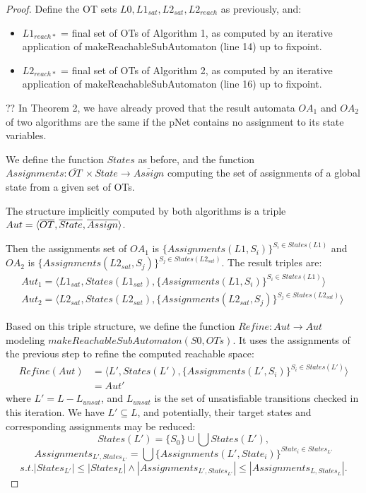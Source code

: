 \documentclass[smallcondensed]{svjour3}
\newcommand{\TODO}[1]{\textcolor{red}{\textbf{[TODO:#1]}}}
\begin{document}
\begin{proof}
  Define the OT sets $L0, L1_{sat}, L2_{sat}, L2_{reach}$ as previously, and:

  \begin{itemize}
    \item $L1_{reach*}$ = final set of OTs of Algorithm 1, as computed
        by an iterative application of makeReachableSubAutomaton (line
        14) up to fixpoint.
      \item $L2_{reach*}$ = final set of OTs of Algorithm 2, as computed
        by an iterative application of makeReachableSubAutomaton (line
        16) up to fixpoint.
  \end{itemize}

?? In Theorem 2, we have already proved that the result automata $OA_1$ and $OA_2$ of two algorithms are the same if the pNet contains no assignment to its state variables.

We define the function $States$ as before, and the function $Assignments : \overline{OT}\ \times State\rightarrow \overline{Assign}$
computing the set of assignments of a global state from a given set of OTs.

The structure implicitly computed by both algorithms is a triple $ Aut= \langle \overline{OT}, \overline{State},\\ \overline{Assign}\rangle$.

Then the assignments set of $OA_1$ is $\{Assignments(L1, S_i)\}^{S_i\in States(L1)}$ and $OA_2$ is $\{Assignments(L2_{sat}, S_j)\}^{S_j\in States(L2_{sat})}$. The result triples are:  
\noindent
\begin{align*}
Aut_1 = \langle L1_{sat}, States(L1_{sat}), \{Assignments(L1, S_i)\}^{S_i\in States(L1)}\rangle\\
Aut_2 = \langle L2_{sat}, States(L2_{sat}), \{Assignments(L2_{sat}, S_j)\}^{S_j\in States(L2_{sat})}\rangle \ 
\end{align*}

Based on this triple structure, we define the function $Refine : Aut \rightarrow Aut$ modeling $makeReachableSubAutomaton(S0,OTs)$. It uses the assignments of the previous step to refine the computed reachable space:
\begin{align*}
Refine(Aut) &=\langle L', States(L'), \{Assignments(L', S_i)\}^{S_i\in States(L')}\rangle \\
&=Aut'
\end{align*}
where $L' = L - L_{unsat}$, and $L_{unsat}$ is the set of unsatisfiable transitions checked in this iteration. We have $L'\subseteq L$, and potentially, their target states and corresponding assignments may be reduced: 
\[States(L')=\{S_0\}\cup \bigcup States(L'),\]
\[Assignments_{L',States_{L'}}=\bigcup\{Assignments(L', State_{i})\}^{State_{i}\in States_{L'}} \]
\[s.t. |States_{L'}|\le|States_{L}|\wedge|Assignments_{L',States_{L'}}|\le|Assignments_{L,States_{L}}|.\]


\end{proof}
\end{document}
